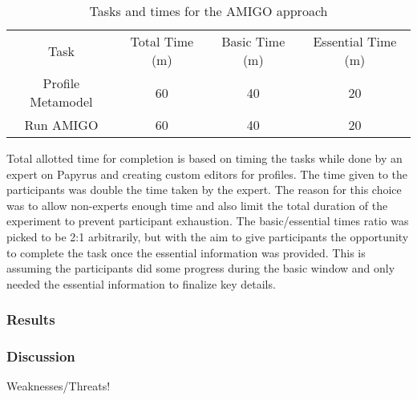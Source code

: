 \begin{table}
    \caption{Tasks and times for the AMIGO approach}
    \centering
    \setlength{\tabcolsep}{3.5pt} 
    \begin{tabular}{|c|c|c|c|}
        Task & Total Time (m) & Basic Time (m) & Essential Time (m) \\ 
        Profile Metamodel & 60 & 40 & 20 \\
        Run AMIGO & 60 & 40 & 20 \\
    \end{tabular}
\end{table}

Total allotted time for completion is based on timing the tasks while done by an expert on Papyrus and creating custom editors for profiles.
The time given to the participants was double the time taken by the expert.
The reason for this choice was to allow non-experts enough time and also limit the total duration of the experiment to prevent participant exhaustion.
The basic/essential times ratio was picked to be 2:1 arbitrarily, but with the aim to give participants the opportunity to complete the task once the essential information was provided.
This is assuming the participants did some progress during the basic window and only needed the essential information to finalize key details.

\subsubsection{Results}



\subsubsection{Discussion}
Weaknesses/Threats!

